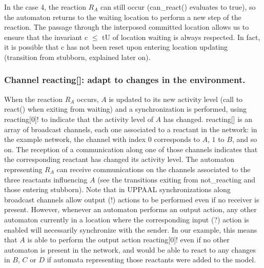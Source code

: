 \documentclass{llncs}
\begin{document}
In the case 4, the reaction $R_A$ can still occur ({\sf can\_react()} evaluates to true), so the automaton
returns to the {\sf waiting} location to perform a new step of the reaction. The passage through
the interposed committed location allows us to ensure
that the invariant {\sf c $\leq$ tU} of location {\sf waiting} is always respected. In fact, it is
possible that {\sf c} has not been reset upon entering location {\sf updating} (transition
from {\sf stubborn}, explained later on).

\subsubsection{Channel {\sf reacting[]}: adapt to changes in the environment.}
When the reaction $R_A$ occurs, $A$ is updated to its new activity level (call to {\sf react()} when
exiting from {\sf waiting}) and a synchronization is performed, using {\sf reacting[0]!}
to indicate that the activity level of $A$ has changed. {\sf reacting[]} is an array of broadcast channels,
each one associated to a reactant in the network: in the example network, the channel with index $0$ corresponds to $A$, $1$ to $B$,
and so on. The reception of a communication along one of those channels
indicates that the corresponding reactant has changed its activity level. The automaton representing $R_A$
can receive communications on the channels associated to the three reactants influencing $A$ (see the transitions
exiting from {\sf not\_reacting} and those entering {\sf stubborn}).
Note that in UPPAAL synchronizations
along broadcast channels allow output ({\sf !}) actions to be performed even if no receiver is present. However,
whenever an automaton performs an output action, any other automaton currently in a location where the
corresponding input ({\sf ?}) action is enabled will necessarily synchronize with the sender.
In our example, this means that $A$ is able to perform the output action {\sf reacting[0]!}
even if no other automaton is present in the network, and would be able to react to any changes
in $B$, $C$ or $D$ if automata representing those reactants were added to the model.
\end{document}
